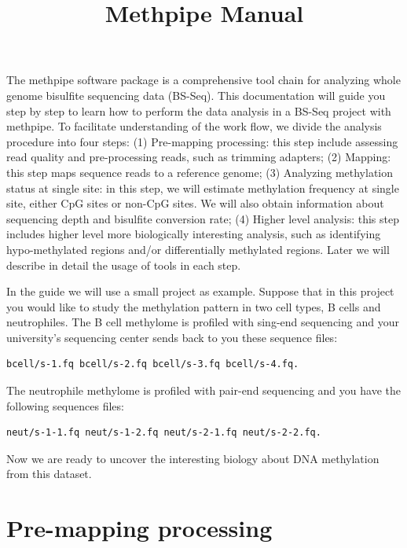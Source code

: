 \documentclass{article}
\title{Methpipe Manual}
\begin{document}
\maketitle
The methpipe software package is a comprehensive tool chain for
analyzing whole genome bisulfite sequencing data (BS-Seq).  This
documentation will guide you step by step to learn how to perform the
data analysis in a BS-Seq project with methpipe. To facilitate
understanding of the work flow, we divide the analysis procedure into
four steps: (1) Pre-mapping processing: this step include assessing
read quality and pre-processing reads, such as trimming adapters; (2)
Mapping: this step maps sequence reads to a reference genome; (3)
Analyzing methylation status at single site: in this step, we will
estimate methylation frequency at single site, either CpG sites or
non-CpG sites. We will also obtain information about sequencing depth
and bisulfite conversion rate; (4) Higher level analysis: this step
includes higher level more biologically interesting analysis, such as
identifying hypo-methylated regions and/or differentially methylated
regions. Later we will describe in detail the usage of tools in each
step.

In the guide we will use a small project as example. Suppose that in
this project you would like to study the methylation pattern in two
cell types, B cells and neutrophiles. The B cell methylome is profiled
with sing-end sequencing and your university's sequencing center sends
back to you these sequence files:
\begin{verbatim}
bcell/s-1.fq bcell/s-2.fq bcell/s-3.fq bcell/s-4.fq.
\end{verbatim}
The neutrophile methylome is profiled with pair-end sequencing and you
have the following sequences files:
\begin{verbatim}
neut/s-1-1.fq neut/s-1-2.fq neut/s-2-1.fq neut/s-2-2.fq.
\end{verbatim}
Now we are ready to uncover the interesting biology about DNA
methylation from this dataset. 

\section{Pre-mapping processing}
\label{sec:premapping}
\end{document}
